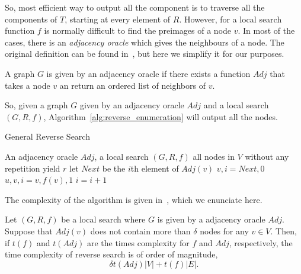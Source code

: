 \documentclass{article}
\begin{document}
So, most efficient way to output all the component is to traverse all
the components of $T$, starting at every element of $R$. 
However, for a local search function $f$ is normally difficult to find
the preimages of a node $v$. In most of the cases, there is an 
\textit{adjacency oracle} which gives the neighbours of a node. The
original definition can be found in~\cite{AvisFukuda}, but here we
simplify it for our purposes. 
\begin{definition}
  A graph $G$ is given by an  adjacency oracle if there exists  a
  function $Adj$ that takes a node $v$ an return an ordered list of
  neighbors of $v$.
\end{definition}
So, given a graph $G$ given by an adjacency oracle $Adj$ and a local
search $(G,R,f)$, Algorithm~\ref{alg:reverse_enumeration} will output
all the nodes. 
\begin{algorithm}
  \caption{General Reverse Search}
  \label{alg:reverse_enumeration}
  \begin{algorithmic}
    \REQUIRE An adjacency oracle $Adj$, a local search $(G,R,f)$
    \ENSURE all nodes in $V$ without any repetition
    \STATE yield $r$
    \STATE let $Next$ be the $i$th element of $Adj(v)$
    \STATE $v, i = Next, 0$
    \ELSE
    \ENDIF
    \ENDWHILE
    \ELSE
    \STATE $u, v, i  = v, f(v), 1$
    \STATE $i = i +1$
    \ENDWHILE
    \ENDIF
    \ENDWHILE
    \ENDFOR
  \end{algorithmic}
\end{algorithm}
The complexity of the algorithm is given in~\cite[Theorem
2.2]{AvisFukuda}, which we enunciate here.
\begin{theorem}
  Let   $(G, R, f)$ be a local search where  $G$ is
  given by a adjacency oracle $Adj$. Suppose that  $Adj(v)$ does not
  contain more than $\delta$ nodes for any $v\in V$. Then, if $t(f)$
  and $t(Adj)$ are the times complexity for $f$ and $Adj$,
  respectively, the time complexity of reverse search is of order of
  magnitude, 
  \begin{equation*}
    \delta t(Adj)|V| + t(f)|E|.
  \end{equation*}
\end{theorem}
\end{document}
